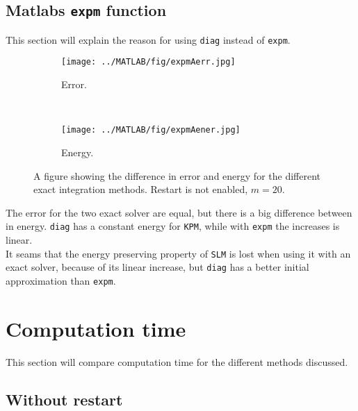 \subsection{Matlabs \texttt{expm} function} \label{sec:resultexpm} %
This section will explain the reason for using \texttt{diag} instead of \texttt{expm}. %
\begin{figure}[H]
        \centering
		\begin{subfigure}[b]{0.45\textwidth}
                \texttt{[image: ../MATLAB/fig/expmAerr.jpg]}
                \caption{ Error. }
                \label{fig:expmSerr}
        \end{subfigure}%
        ~
        \begin{subfigure}[b]{0.45\textwidth}
                \texttt{[image: ../MATLAB/fig/expmAener.jpg]}
                \caption{ Energy. }
                \label{fig:expmSener}
        \end{subfigure}
        \caption{A figure showing the difference in error and energy for the different exact integration methods. Restart is not enabled, $m = 20$. }
        \label{fig:expm}
\end{figure}
\noindent The error for the two exact solver are equal, but there is a big difference between in energy. \texttt{diag} has a constant energy for \texttt{KPM}, while with \texttt{expm} the increases is linear.\\
It seams that the energy preserving property of \texttt{SLM} is lost when using it with an exact solver, because of its linear increase, but \texttt{diag} has a better initial approximation than \texttt{expm}. \\
\section{Computation time}%
\label{sec:cruntime}
This section will compare computation time for the different methods discussed. 

\subsection{Without restart}

